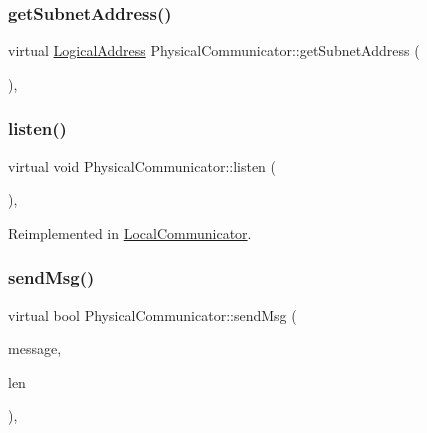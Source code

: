 \subsubsection{\texorpdfstring{get\+Subnet\+Address()}{getSubnetAddress()}}
{\footnotesize\ttfamily virtual \hyperlink{structLogicalAddress}{Logical\+Address} Physical\+Communicator\+::get\+Subnet\+Address (\begin{DoxyParamCaption}{ }\end{DoxyParamCaption})\hspace{0.3cm}{\ttfamily [inline]}, {\ttfamily [virtual]}}

\mbox{\label{classPhysicalCommunicator_a4886f4453c1f830ceaef56bc8602423f}} 
\subsubsection{\texorpdfstring{listen()}{listen()}}
{\footnotesize\ttfamily virtual void Physical\+Communicator\+::listen (\begin{DoxyParamCaption}\item[{std\+::function$<$ void(\hyperlink{structcubiumServerSocket__t}{cubium\+Server\+Socket\+\_\+t} $\ast$)$>$}]{ }\end{DoxyParamCaption})\hspace{0.3cm}{\ttfamily [inline]}, {\ttfamily [virtual]}}



Reimplemented in \hyperlink{classLocalCommunicator_a320a09f88a1eb840e517753b603cd08b}{Local\+Communicator}.

\mbox{\label{classPhysicalCommunicator_a9fc5595b693f9908a20d0e64a6579bb5}} 
\subsubsection{\texorpdfstring{send\+Msg()}{sendMsg()}}
{\footnotesize\ttfamily virtual bool Physical\+Communicator\+::send\+Msg (\begin{DoxyParamCaption}\item[{\hyperlink{structSpaMessage}{Spa\+Message} $\ast$}]{message,  }\item[{ssize\+\_\+t}]{len }\end{DoxyParamCaption})\hspace{0.3cm}{\ttfamily [inline]}, {\ttfamily [virtual]}}



